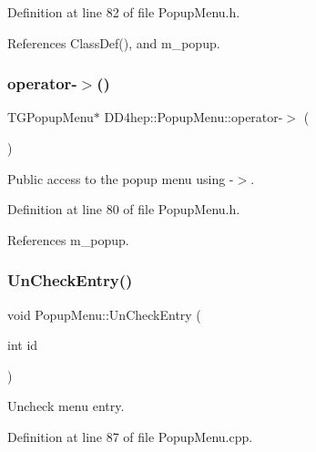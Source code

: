 Definition at line 82 of file Popup\+Menu.\+h.



References Class\+Def(), and m\+\_\+popup.

\hypertarget{class_d_d4hep_1_1_popup_menu_a0241a71021c9288a1f6207a25d6a82e6}{}\label{class_d_d4hep_1_1_popup_menu_a0241a71021c9288a1f6207a25d6a82e6} 
\subsubsection{\texorpdfstring{operator-\/$>$()}{operator->()}}
{\footnotesize\ttfamily T\+G\+Popup\+Menu$\ast$ D\+D4hep\+::\+Popup\+Menu\+::operator-\/$>$ (\begin{DoxyParamCaption}{ }\end{DoxyParamCaption})\hspace{0.3cm}{\ttfamily [inline]}}



Public access to the popup menu using \textquotesingle{}-\/$>$\textquotesingle{}. 



Definition at line 80 of file Popup\+Menu.\+h.



References m\+\_\+popup.

\hypertarget{class_d_d4hep_1_1_popup_menu_aca647cd86c210af4bf0f4e48f487a341}{}\label{class_d_d4hep_1_1_popup_menu_aca647cd86c210af4bf0f4e48f487a341} 
\subsubsection{\texorpdfstring{Un\+Check\+Entry()}{UnCheckEntry()}}
{\footnotesize\ttfamily void Popup\+Menu\+::\+Un\+Check\+Entry (\begin{DoxyParamCaption}\item[{int}]{id }\end{DoxyParamCaption})}



Uncheck menu entry. 



Definition at line 87 of file Popup\+Menu.\+cpp.



